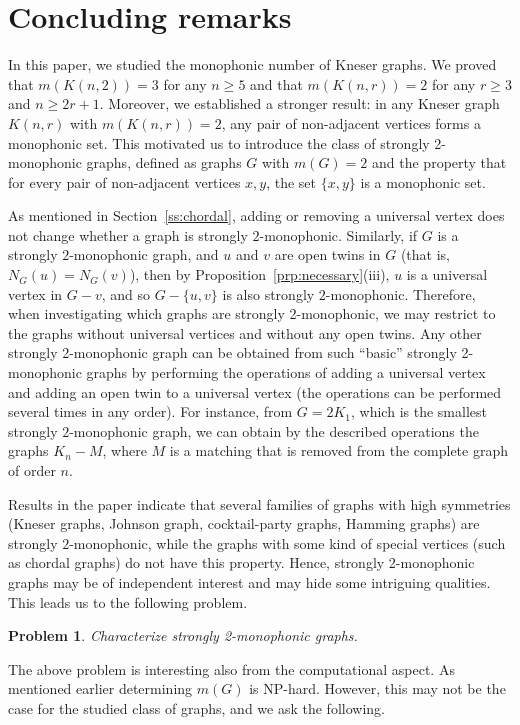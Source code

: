 \documentclass[a4paper,11pt]{article}
\newtheorem{problem}[theorem]{Problem}
\begin{document}
\section{Concluding remarks}

In this paper, we studied the monophonic number of Kneser graphs. We proved that $m(K(n,2))=3$ for any $n \geq 5$ and that $m(K(n,r))=2$ for any $r\geq 3$ and $n\geq 2r+1$. Moreover, we established a stronger result: in any Kneser graph $K(n,r)$ with $m(K(n,r))=2$, any pair of non-adjacent vertices forms a monophonic set. This motivated us to introduce the class of strongly 2-monophonic graphs, defined as graphs $G$ with $m(G)=2$ and the property that for every pair of non-adjacent vertices $x,y$, the set $\{x,y\}$ is a monophonic set. 

As mentioned in Section~\ref{ss:chordal}, adding or removing a universal vertex does not change whether a graph is strongly $2$-monophonic. Similarly, if $G$ is a strongly $2$-monophonic graph, and $u$ and $v$ are open twins in $G$ (that is, $N_G(u)=N_G(v)$), then by Proposition~\ref{prp:necessary}(iii), $u$ is a universal vertex in $G-v$, and so $G-\{u,v\}$ is also strongly $2$-monophonic. Therefore, when investigating which graphs are strongly 2-monophonic, we may restrict to the graphs without universal vertices and without any open twins. 
Any other strongly 2-monophonic graph can be obtained from such ``basic'' strongly 2-monophonic graphs by performing the operations of adding a universal vertex and adding an open twin to a universal vertex (the operations can be performed several times in any order).   
For instance, from $G=2K_1$, which is the smallest strongly $2$-monophonic graph, we can obtain by the described operations the graphs $K_n-M$, where $M$ is a matching that is removed from the complete graph of order $n$.

Results in the paper indicate that several families of graphs  with high symmetries (Kneser graphs, Johnson graph, cocktail-party graphs, Hamming graphs) are strongly $2$-monophonic, while the graphs with some kind of special vertices (such as chordal graphs) do not have this property. 
Hence, strongly 2-monophonic graphs may be of independent interest and may hide some intriguing qualities. This leads us to the following problem.

\begin{problem}
Characterize strongly 2-monophonic graphs.
\end{problem}

The above problem is interesting also from the computational aspect. As mentioned earlier determining $m(G)$ is NP-hard. However, this may not be the case for the studied class of graphs, and we ask the following.
\end{document}
